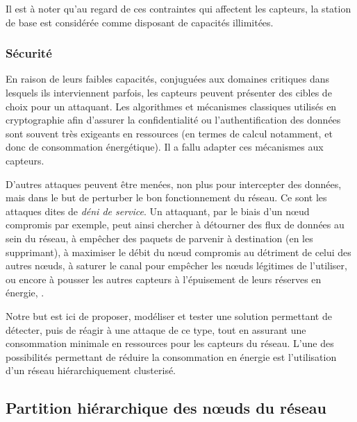 Il est à noter qu'au regard de ces contraintes qui affectent les capteurs, la station de base est considérée comme disposant de capacités illimitées.

        \subsubsection{Sécurité}
En raison de leurs faibles capacités, conjuguées aux domaines critiques dans lesquels ils interviennent parfois, les capteurs peuvent présenter des cibles de choix pour un attaquant.
Les algorithmes et mécanismes classiques utilisés en cryptographie afin d'assurer la confidentialité ou l'authentification des données sont souvent très exigeants en ressources (en termes de calcul notamment, et donc de consommation énergétique).
Il a fallu adapter ces mécanismes aux capteurs.

D'autres attaques peuvent être menées, non plus pour intercepter des données, mais dans le but de perturber le bon fonctionnement du réseau.
Ce sont les attaques dites de \textit{déni de service}.
Un attaquant, par le biais d'un nœud compromis par exemple, peut ainsi chercher à détourner des flux de données au sein du réseau, à empêcher des paquets de parvenir à destination (en les supprimant), à maximiser le débit du nœud compromis au détriment de celui des autres nœuds, à saturer le canal pour empêcher les nœuds légitimes de l'utiliser, ou encore à pousser les autres capteurs à l'épuisement de leurs réserves en énergie, \etc.

Notre but est ici de proposer, modéliser et tester une solution permettant de détecter, puis de réagir à une attaque de ce type, tout en assurant une consommation minimale en ressources pour les capteurs du réseau.
L'une des possibilités permettant de réduire la consommation en énergie est l'utilisation d'un réseau hiérarchiquement clusterisé.

    \subsection{Partition hiérarchique des nœuds du réseau}
    \label{st:subsec:partition}

